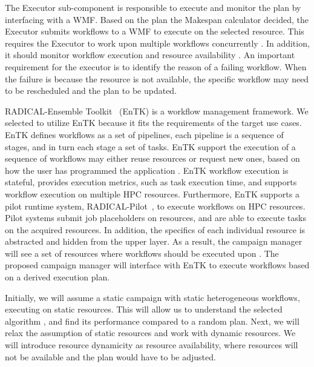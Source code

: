 The Executor sub-component is responsible to execute and monitor the plan  by interfacing with a WMF.
Based on the plan the Makespan calculator decided, the Executor submits workflows to a WMF to execute on the selected resource.
This requires the Executor to work upon multiple workflows concurrently .
In addition, it should monitor workflow execution and resource availability .
An important requirement for the executor is to identify the reason of a failing workflow.
When the failure is because the resource is not available, the specific workflow may need to be rescheduled and the plan to be updated.

RADICAL-Ensemble Toolkit~\cite{balasubramanian2018harnessing} (EnTK) is a workflow management framework.
We selected to utilize EnTK because it fits the requirements of the target use cases.
EnTK defines workflows as a set of pipelines, each pipeline is a sequence of stages, and in turn each stage a set of tasks.
EnTK support the execution of a sequence of workflows may either reuse resources or request new ones, based on how the user has programmed the application .
EnTK workflow execution is stateful, provides execution metrics, such as task execution time, and supports workflow execution on multiple HPC resources.
Furthermore, EnTK supports a pilot runtime system, RADICAL-Pilot~\cite{merzky2019using}, to execute workflows on HPC resources.
Pilot systems submit job placeholders on resources, and are able to execute tasks on the acquired resources.
In addition, the specifics of each individual resource is abstracted and hidden from the upper layer.
As a result, the campaign manager will see a set of resources where workflows should be executed upon .
The proposed campaign manager will interface with EnTK to execute workflows based on a derived execution plan.


Initially, we will assume a static campaign with static heterogeneous workflows, executing on static resources.
This will allow us to understand the selected algorithm , and find its performance compared to a random plan.
Next, we will relax the assumption of static resources and work with dynamic resources.
We will introduce resource dynamicity as resource availability, where resources will not be available and the plan would have to be adjusted.

